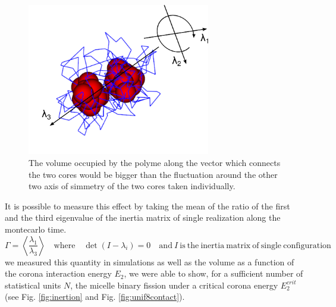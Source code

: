\documentclass[12pt,a4paper,notitlepage]{article}
\begin{document}
\begin{figure}[h!]
\centering
\includegraphics[width=8cm]{simmbr}
\caption{The volume occupied by the polyme along the vector which connects
the two cores would be bigger than the fluctuation around the other
two axis of simmetry of the two cores taken individually.}
\label{fig:simmbr}
\end{figure}

It is possible to measure this effect by taking the mean of the
ratio of the first and the third eigenvalue of the inertia matrix of
single realization along the montecarlo time.
\begin{equation}
\Gamma = \left\langle \frac{\lambda_1}{\lambda_3} \right\rangle \quad
\mathrm{where} \quad \det(I - \lambda_i) = 0 \quad \mathrm{and}\ I\
\mathrm{is\ the\ inertia\ matrix\ of\ single\ configuration}
\end{equation}
we measured this quantity in simulations as well as the volume
as a function of the corona interaction energy $E_2$, we were able to
show, for a sufficient number of statistical units $N$, the micelle
binary fission under a critical corona energy $E_2^{crit}$ (see
Fig. \ref{fig:inertion} and Fig. \ref{fig:unif8contact}).
\end{document}
